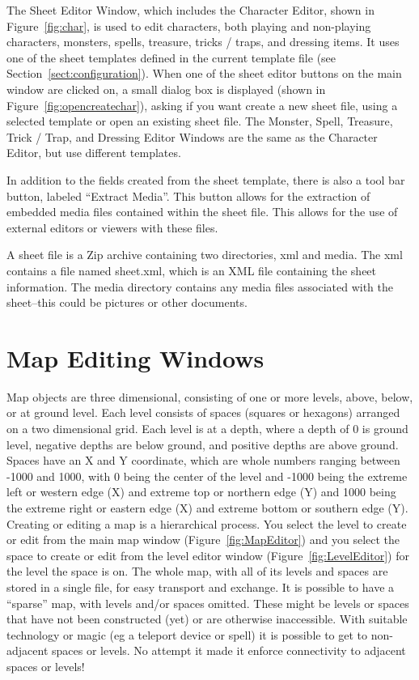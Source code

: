 The Sheet Editor Window, which includes the Character Editor, shown in
Figure~\ref{fig:char}, is used to edit characters, both playing and
non-playing characters, monsters, spells, treasure, tricks / traps, and
dressing items.  It uses one of the sheet templates defined in the
current template file (see Section~\ref{sect:configuration}).  When one
of the sheet editor buttons on the main window are clicked on, a small
dialog box is displayed (shown in Figure~\ref{fig:opencreatechar}),
asking if you want create a new sheet file, using a selected template
or open an existing sheet file. The Monster, Spell, Treasure,  Trick /
Trap, and Dressing Editor Windows are the same as the Character Editor,
but use different templates.

In addition to the fields created from the sheet template, there is also
a tool bar button, labeled ``Extract Media''.  This button allows for the
extraction of embedded media files contained within the sheet file. 
This allows for the use of external editors or viewers with these files.

A sheet file is a Zip archive containing two directories, xml and media.
The xml contains a file named sheet.xml, which is an XML file containing
the sheet information.  The media directory contains any media files
associated with the sheet--this could be pictures or other documents.

\section{Map Editing Windows}
\label{Map}

Map objects are three dimensional, consisting of one or more levels,
above, below, or at ground level.  Each level consists of spaces
(squares or hexagons) arranged on a two dimensional grid.  Each level
is at a depth, where a depth of 0 is ground level, negative depths are
below ground, and positive depths are above ground.  Spaces have an X
and Y coordinate, which are whole numbers ranging between -1000 and
1000, with 0 being the center of the level and -1000 being the extreme
left or western edge (X) and extreme top or northern edge (Y) and 1000
being the extreme right or eastern edge (X) and extreme bottom or
southern edge (Y). Creating or editing a map is a hierarchical process. 
You select the level to create or edit from the main map window
(Figure~\ref{fig:MapEditor}) and you select the space to create or edit
from the level editor window (Figure~\ref{fig:LevelEditor}) for the
level the space is on.  The whole map, with all of its levels and
spaces are stored in a single file, for easy transport and exchange.  It
is possible to have a ``sparse'' map, with levels and/or spaces
omitted.  These might be levels or spaces that have not been
constructed (yet) or are otherwise inaccessible.  With suitable
technology or magic (eg a teleport device or spell) it is possible to
get to non-adjacent spaces or levels.  No attempt it made it enforce
connectivity to adjacent spaces or levels!

